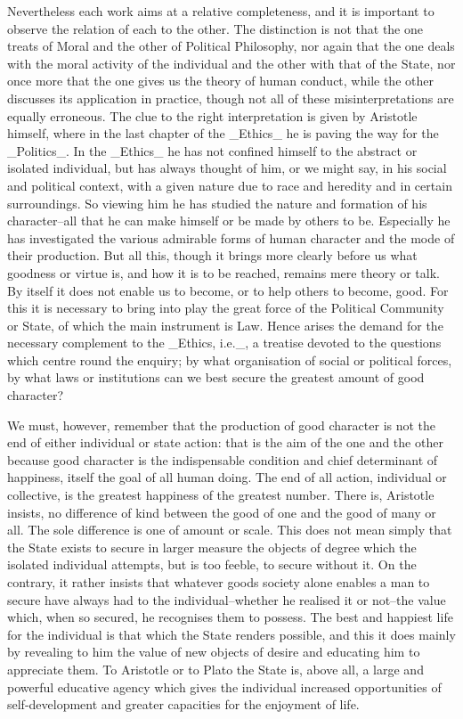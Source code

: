 Nevertheless each work aims at a relative completeness, and it is
important to observe the relation of each to the other. The distinction
is not that the one treats of Moral and the other of Political
Philosophy, nor again that the one deals with the moral activity of the
individual and the other with that of the State, nor once more that the
one gives us the theory of human conduct, while the other discusses its
application in practice, though not all of these misinterpretations are
equally erroneous. The clue to the right interpretation is given by
Aristotle himself, where in the last chapter of the _Ethics_ he is
paving the way for the _Politics_. In the _Ethics_ he has not confined
himself to the abstract or isolated individual, but has always thought
of him, or we might say, in his social and political context, with a
given nature due to race and heredity and in certain surroundings.
So viewing him he has studied the nature and formation of his
character--all that he can make himself or be made by others to be.
Especially he has investigated the various admirable forms of human
character and the mode of their production. But all this, though it
brings more clearly before us what goodness or virtue is, and how it is
to be reached, remains mere theory or talk. By itself it does not
enable us to become, or to help others to become, good. For this it is
necessary to bring into play the great force of the Political Community
or State, of which the main instrument is Law. Hence arises the demand
for the necessary complement to the _Ethics, i.e._, a treatise devoted
to the questions which centre round the enquiry; by what organisation
of social or political forces, by what laws or institutions can we best
secure the greatest amount of good character?

We must, however, remember that the production of good character is not
the end of either individual or state action: that is the aim of the one
and the other because good character is the indispensable condition and
chief determinant of happiness, itself the goal of all human doing. The
end of all action, individual or collective, is the greatest happiness
of the greatest number. There is, Aristotle insists, no difference of
kind between the good of one and the good of many or all. The sole
difference is one of amount or scale. This does not mean simply that the
State exists to secure in larger measure the objects of degree which the
isolated individual attempts, but is too feeble, to secure without it.
On the contrary, it rather insists that whatever goods society alone
enables a man to secure have always had to the individual--whether he
realised it or not--the value which, when so secured, he recognises them
to possess. The best and happiest life for the individual is that which
the State renders possible, and this it does mainly by revealing to him
the value of new objects of desire and educating him to appreciate them.
To Aristotle or to Plato the State is, above all, a large and powerful
educative agency which gives the individual increased opportunities of
self-development and greater capacities for the enjoyment of life.

